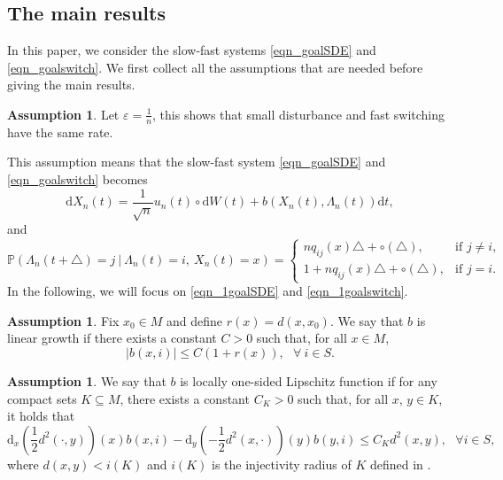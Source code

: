 \documentclass[a4paper]{article}
\numberwithin{equation}{section}
\theoremstyle{definition}
\newtheorem{assumption}[theorem]{Assumption}
\begin{document}
\subsection{The main results}
In this paper, we consider the slow-fast systems \eqref{eqn_goalSDE} and \eqref{eqn_goalswitch}.
We first collect all the assumptions that are needed before giving the main results.

\begin{assumption}\label{assu_varn_manifold}
	Let $\varepsilon=\frac{1}{n}$, this shows that small disturbance and fast switching have the same rate.
\end{assumption}

This assumption means that the slow-fast system
      \eqref{eqn_goalSDE} and \eqref{eqn_goalswitch} becomes 
\begin{equation}\label{eqn_1goalSDE}
    \mathrm{d}X_n(t)=\frac{1}{\sqrt{n}}u_n(t) \circ\mathrm{d}W(t)+b(X_n(t),\Lambda_n(t))\mathrm{d}t,
\end{equation}
and
\begin{equation}\label{eqn_1goalswitch}
	\mathbb{P} (\Lambda_n(t+\triangle)=j~|~\Lambda_n(t)=i,~ X_n(t)= x)=
	\begin{cases}
		nq_{ij}(x)\triangle+ \circ(\triangle) ,&\mbox{if $j\neq i$,}\\
		1+nq_{ij}(x)\triangle +\circ(\triangle),&\mbox{if $j=i$.}
	\end{cases}
\end{equation}
In the following, we will focus on \eqref{eqn_1goalSDE} and \eqref{eqn_1goalswitch}.
\begin{assumption}\label{ass_b_linear_growth} Fix $x_0\in M$ and define $r(x)=d(x,x_0)$. We say that $b$ is linear growth if there exists a constant $C>0$ such that, for all $x\in M$,
\begin{equation*}
    |b(x,i)|\leq C(1+r(x)),~~~\forall~i\in S.
\end{equation*}
\end{assumption}

\begin{assumption}\label{ass_b_one_side}
    We say that $b$ is locally one-sided Lipschitz function if for any compact sets $K\subseteq M$, there exists a constant $C_K> 0$ such that, for all $x$, $y\in K$, it holds that \begin{equation*}
    \mathrm{d}_x\left(\frac{1}{2}d^2(\cdot, y)\right)(x)b(x,i)-\mathrm{d}_y\left(-\frac{1}{2}d^2(x,\cdot)\right)(y)b(y,i)\leq C_Kd^2(x,y),~~~\forall i\in S,
    \end{equation*}
    where $d(x,y)<i(K)$ and $i(K)$ is the injectivity radius of $K$ defined in .
\end{assumption}
\end{document}
